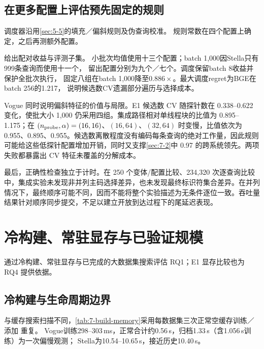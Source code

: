 \subsection{在更多配置上评估预先固定的规则}

调度器沿用\cref{sec:5-5}的填充／偏斜规则及伪查询校准。
规则常数在四个配置上确定，之后再测额外配置。


\begin{table}[tbp]
\centering
\caption[集成执行与调度收益]{集成执行相对 v61 L16 的收益。每项先计算单元内五轮配对加速比的中位数，再跨单元取几何平均。“留出配置”排除了设置规则时使用的四个配置，指的是未用于设定规则的配置，不是预算实验中的留出查询划分。}
\label{tab:7-scheduling}
\small\setlength{\tabcolsep}{4pt}

\end{table}

给出配对收益与评测子集。
小批次均值使用十三个配置；batch 1,000因Stella只有999条查询而使用十一个，
留出配置分别为九个／七个。调度保留batch 8收益并保护全批次执行，
固定八组在batch 1,000降至$0.886\times$。最大调度regret为BGE在batch 256的1.217，
说明候选数CV遗漏部分遍历与选择成本。

Vogue 同时说明偏斜特征的价值与局限。E1 候选数 CV 随探针数在 0.338--0.622 变化，使批大小 1,000 仍采用四组。集成路径相对单线程块的比值为 0.895--1.175；在 $(n_{\rm probe},\alpha)=(16,16)$、$(16,64)$、$(32,64)$ 时变慢，比值依次为 0.955、0.895、0.955。候选数离散程度没有编码每条查询的绝对工作量，因此规则可能给这些低探针配置增加开销，同时又支撑\cref{sec:7-2}中 0.97 的跨系统领先。两项失败都暴露出 CV 特征未覆盖的分解成本。

最后，正确性检查独立于计时。在 250 个变体/配置比较、234,320 次逐查询比较中，集成实验未发现非并列主码选择差异，也未发现最终标识符集合差异。在并列情况下，最终顺序可能不同，因而不能将整个实验描述为无条件逐位一致。吞吐量结果针对顺序同步提交，不足以建立开放到达过程下的尾延迟表现。

\section{冷构建、常驻显存与已验证规模}
\label{sec:7-7}

通过冷构建、常驻显存与已完成的大数据集搜索评估 RQ1；E1 显存比较也为 RQ4 提供依据。

\subsection{冷构建与生命周期边界}

与缓存搜索扫描不同，\cref{tab:7-build-memory}采用每数据集三次正常空缓存训练／添加
重复。
Vogue训练298--303\,ms，正常合计约0.56\,s，归档1.33\,s（含1.056\,s训练）为一次偏慢观测；
Stella为10.54--10.65\,s，接近历史10.40\,s。

